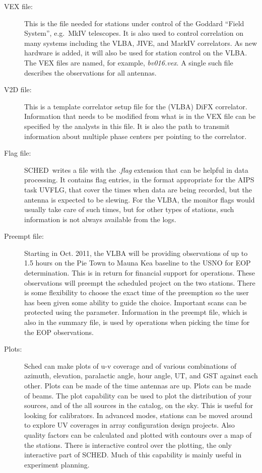\documentclass{report}
\newcommand{\schedb}{{\sc SCHED~}}
\begin{document}
\begin{description}
\item[VEX file:] This is the file needed for stations under control of
the Goddard ``Field System'', e.g.\ MkIV telescopes.  It is also used
to control correlation on many systems including the VLBA, JIVE, and
MarkIV correlators.  As new hardware is added, it will also be used
for station control on the VLBA.  The VEX files are named, for
example, {\sl bv016.vex}.  A single such file describes the
observations for all antennas.

\item[V2D file:] This is a template correlator setup file for the
(VLBA) DiFX correlator.  Information that needs to be modified from what
is in the VEX file can be specified by the analysts in this file.
It is also the path to transmit information about multiple phase
centers per pointing to the correlator.

\item[Flag file:] \schedb writes a file with the {\sl .flag} extension
that can be helpful in data processing.  It contains flag entries, in
the format appropriate for the AIPS task UVFLG, that cover the times
when data are being recorded, but the antenna is expected to be
slewing.  For the VLBA, the monitor flags would usually take care of
such times, but for other types of stations, such information is not
always available from the logs.

\item[Preempt file:] Starting in Oct. 2011, the VLBA will be providing
observations of up to 1.5 hours on the Pie Town to Mauna Kea baseline
to the USNO for EOP determination.  This is in return for financial
support for operations.  These observations will preempt the scheduled
project on the two stations.  There is some flexibility to choose the
exact time of the preemption so the user has been given some ability
to guide the choice.  Important scans can be protected using the
 parameter.  Information in the
preempt file, which is also in the summary file, is used by operations
when picking the time for the EOP observations.

\item[Plots:] Sched can make plots of u-v coverage and of various
combinations of azimuth, elevation, paralactic angle, hour angle, UT,
and GST against each other.  Plots can be made of the time antennas
are up.  Plots can be made of beams.  The plot capability can be used
to plot the distribution of your sources, and of the all sources in
the catalog, on the sky.  This is useful for looking for calibrators.
In advanced modes, stations can be moved around to explore UV
coverages in array configuration design projects.  Also quality
factors can be calculated and plotted with contours over a map of the
stations.  There is interactive control over the plotting, the only
interactive part of SCHED.  Much of this capability is mainly useful
in experiment planning.


\end{description}
\end{document}

